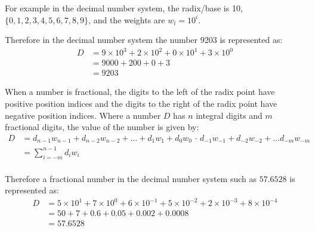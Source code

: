 \documentclass[12pt letter]{report}
\begin{document}

For example in the decimal number system, the radix/base is 10, $\{0,1,2,3,4,5,6,7,8,9\} $, and the weights are $w_i = 10^i$.

Therefore in the decimal number system the number 9203 is represented as:
\begin{align*}
  D & = 9 \times 10^{3} + 2 \times 10^{2} + 0 \times 10^{1} + 3 \times 10^{0} \\
    & = 9000 + 200 + 0 + 3                                                    \\
    & = 9203
\end{align*}


When a number is fractional, the digits to the left of the radix point have positive position indices and the digits to
the right of the radix point have negative position indices. Where a number $D$ has $n$ integral digits and $m$
fractional digits, the value of the number is given by:
\begin{align*}
  D & = d_{n-1} w_{n-1} + d_{n-2} w_{n-2} + \ldots + d_1 w_1 + d_0 w_0\, \cdot \, d_{-1} w_{-1} + d_{-2} w_{-2} + \ldots
  d_{-m} w_{-m}                                                                                                          \\
    & = \displaystyle\sum_{i=-m}^{n-1} d_i w_i                                                                           \\
\end{align*}

Therefore a fractional number in the decimal number system such as $57.6528$ is represented as:
\begin{align*}
  D & =  5 \times 10^{1} + 7 \times 10^{0} + 6 \times 10^{-1} + 5 \times 10^{-2} + 2 \times 10^{-3} + 8 \times 10^{-4} \\
    & =  50 + 7 + 0.6 + 0.05 + 0.002 + 0.0008                                                                          \\
    & =  57.6528
\end{align*}
\end{document}
